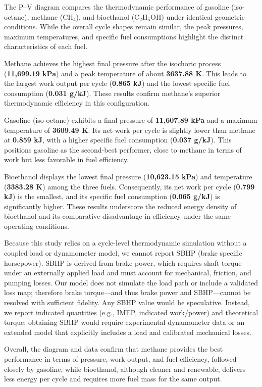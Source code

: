 \documentclass[man,floatsintext,noextraspace]{apa6}
\begin{document}
The P--V diagram compares the thermodynamic performance of gasoline (iso-octane), methane (CH$_4$), and bioethanol (C$_2$H$_5$OH) under identical geometric conditions. While the overall cycle shapes remain similar, the peak pressures, maximum temperatures, and specific fuel consumptions highlight the distinct characteristics of each fuel.  

Methane achieves the highest final pressure after the isochoric process (\textbf{11,699.19 kPa}) and a peak temperature of about \textbf{3637.88 K}. This leads to the largest work output per cycle (\textbf{0.865 kJ}) and the lowest specific fuel consumption (\textbf{0.031 g/kJ}). These results confirm methane’s superior thermodynamic efficiency in this configuration.  

Gasoline (iso-octane) exhibits a final pressure of \textbf{11,607.89 kPa} and a maximum temperature of \textbf{3609.49 K}. Its net work per cycle is slightly lower than methane at \textbf{0.859 kJ}, with a higher specific fuel consumption (\textbf{0.037 g/kJ}). This positions gasoline as the second-best performer, close to methane in terms of work but less favorable in fuel efficiency.  

Bioethanol displays the lowest final pressure (\textbf{10,623.15 kPa}) and temperature (\textbf{3383.28 K}) among the three fuels. Consequently, its net work per cycle (\textbf{0.799 kJ}) is the smallest, and its specific fuel consumption (\textbf{0.065 g/kJ}) is significantly higher. These results underscore the reduced energy density of bioethanol and its comparative disadvantage in efficiency under the same operating conditions.  
  

Because this study relies on a cycle-level thermodynamic simulation without a coupled load or dynamometer model, we cannot report SBHP (brake specific horsepower). SBHP is derived from brake power, which requires shaft torque under an externally applied load and must account for mechanical, friction, and pumping losses. Our model does not simulate the load path or include a validated loss map; therefore brake torque—and thus brake power and SBHP—cannot be resolved with sufficient fidelity. Any SBHP value would be speculative. Instead, we report indicated quantities (e.g., IMEP, indicated work/power) and theoretical torque; obtaining SBHP would require experimental dynamometer data or an extended model that explicitly includes a load and calibrated mechanical losses.


Overall, the diagram and data confirm that methane provides the best performance in terms of pressure, work output, and fuel efficiency, followed closely by gasoline, while bioethanol, although cleaner and renewable, delivers less energy per cycle and requires more fuel mass for the same output.
\end{document}
